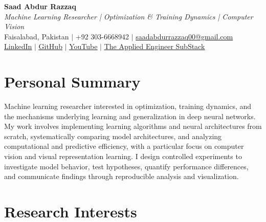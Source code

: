 \documentclass[10.5pt,a4paper]{article}
\begin{document}
\begin{center}
    {\LARGE \bfseries Saad Abdur Razzaq}\\[3pt]

    \textit{Machine Learning Researcher | Optimization \& Training Dynamics | Computer Vision}\\[3pt]

    Faisalabad, Pakistan
    \quad $\vert$ \quad
    +92 303-6668942
    \quad $\vert$ \quad
    \href{mailto:saadabdurrazzaq00@gmail.com}
    {saadabdurrazzaq00@gmail.com}
    \\[2pt]

    \href{https://linkedin.com/in/saadarazzaq/}
    {\underline{LinkedIn}}
    \quad $\vert$ \quad
    \href{https://github.com/SaadARazzaq}
    {\underline{GitHub}}
    \quad $\vert$ \quad
    \href{https://youtube.com/@SaadARazzaq}
    {\underline{YouTube}}
    \quad $\vert$ \quad
    \href{https://theappliedengineer.substack.com/}
    {\underline{The Applied Engineer SubStack}}
\end{center}


\section*{Personal Summary}

Machine learning researcher interested in optimization, training dynamics, and the mechanisms underlying learning and generalization in deep neural networks. My work involves implementing learning algorithms and neural architectures from scratch, systematically comparing model architectures, and analyzing computational and predictive efficiency, with a particular focus on computer vision and visual representation learning. I design controlled experiments to investigate model behavior, test hypotheses, quantify performance differences, and communicate findings through reproducible analysis and visualization.



\section*{Research Interests}
\end{document}
